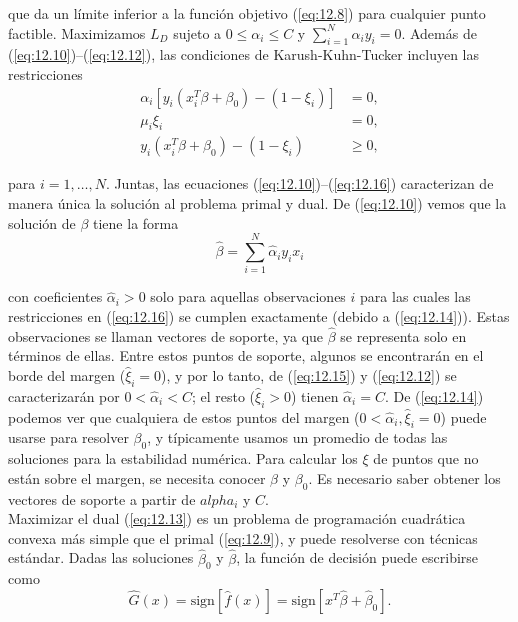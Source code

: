 que da un límite inferior a la función objetivo (\ref{eq:12.8}) para cualquier punto factible. Maximizamos $L_D$ sujeto a $0 \leq \alpha_i \leq C$ y $\sum_{i=1}^N \alpha_i y_i = 0$. Además de (\ref{eq:12.10})–(\ref{eq:12.12}), las condiciones de Karush-Kuhn-Tucker incluyen las restricciones
\begin{align}
\alpha_i [y_i (x_i^T \beta + \beta_0) - (1 - \xi_i)] &= 0, \label{eq:12.14}\\
\mu_i \xi_i &= 0, \label{eq:12.15} \\
y_i (x_i^T \beta + \beta_0) - (1 - \xi_i) &\geq 0, \label{eq:12.16}
\end{align}

para $i = 1, \ldots, N$. Juntas, las ecuaciones (\ref{eq:12.10})–(\ref{eq:12.16}) caracterizan de manera única la solución al problema primal y dual. De (\ref{eq:12.10}) vemos que la solución de $\beta$ tiene la forma 
\begin{equation}
\hat{\beta} = \sum_{i=1}^N \hat{\alpha}_i y_i x_i
\label{eq:12.17}    
\end{equation}

con coeficientes $\hat{\alpha}_i > 0$ solo para aquellas observaciones $i$ para las cuales las restricciones en (\ref{eq:12.16}) se cumplen exactamente (debido a (\ref{eq:12.14})). Estas observaciones se llaman vectores de soporte, ya que $\hat{\beta}$ se representa solo en términos de ellas. Entre estos puntos de soporte, algunos se encontrarán en el borde del margen ($\hat{\xi}_i = 0$), y por lo tanto, de (\ref{eq:12.15}) y (\ref{eq:12.12}) se caracterizarán por $0 < \hat{\alpha}_i < C$; el resto ($\hat{\xi}_i > 0$) tienen $\hat{\alpha}_i = C$. De (\ref{eq:12.14}) podemos ver que cualquiera de estos puntos del margen ($0 < \hat{\alpha}_i, \hat{\xi}_i = 0$) puede usarse para resolver $\beta_0$, y típicamente usamos un promedio de todas las soluciones para la estabilidad numérica. Para calcular los $\xi$ de puntos que no están sobre el margen, se necesita conocer $\beta$ y $\beta_0$. Es necesario saber obtener los vectores de soporte a partir de $alpha_i$ y $C$. \\

Maximizar el dual (\ref{eq:12.13}) es un problema de programación cuadrática convexa más simple que el primal (\ref{eq:12.9}), y puede resolverse con técnicas estándar. Dadas las soluciones $\hat{\beta}_0$ y $\hat{\beta}$, la función de decisión puede escribirse como
\begin{equation}
    \hat{G}(x) = \text{sign}[\hat{f}(x)] = \text{sign}[x^T\hat{\beta} + \hat{\beta}_0].
\end{equation}

